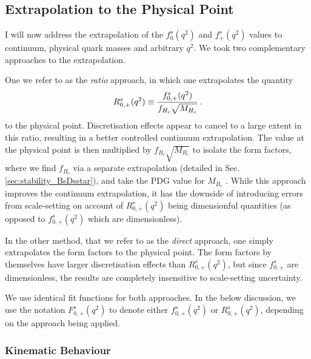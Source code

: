 \subsection{Extrapolation to the Physical Point}
\label{sec:extrapolation}

I will now address the extrapolation of the $f_{0}^s(q^2)$ and $f_{+}^s(q^2)$ values to continuum, physical quark masses and arbitrary $q^2$. We took two complementary approaches to the extrapolation.

One we refer to as the {\textit{ratio}} approach, in which one extrapolates the quantity
\begin{align}
  R^s_{0,+}(q^2) \equiv {f^s_{0,+}(q^2)\over f_{H_c}\sqrt{M_{H_c}}}\,.
  \label{eq:ratio}
\end{align}
to the physical point. Discretisation effects appear to cancel to a large extent in this ratio, resulting in a better controlled continuum extrapolation. The value at the physical point is then multiplied by $f_{B_c}\sqrt{M_{B_c}}$ to isolate the form factors, where we find $f_{B_c}$ via a separate extrapolation (detailed in Sec. \ref{sec:stability_BsDsstar}), and take the PDG value for $M_{B_c}$ \cite{PhysRevD.98.030001}. While this approach improves the continuum extrapolation, it has the downside of introducing errors from scale-setting on account of $R_{0,+}^s(q^2)$ being dimensionful quantities (as opposed to $f^s_{0,+}(q^2)$ which are dimensionless).

In the other method, that we refer to as the {\textit{direct}} approach, one simply extrapolates the form factors to the physical point. The form factors by themselves have larger discretisation effects than $R_{0,+}^s(q^2)$, but since $f^s_{0,+}$ are dimensionless, the results are completely insensitive to scale-setting uncertainty.

We use identical fit functions for both approaches. In the below discussion, we use the notation $F^s_{0,+}(q^2)$ to denote either $f^s_{0,+}(q^2)$ or $R_{0,+}^s(q^2)$, depending on the approach being applied.

\subsubsection{Kinematic Behaviour}

